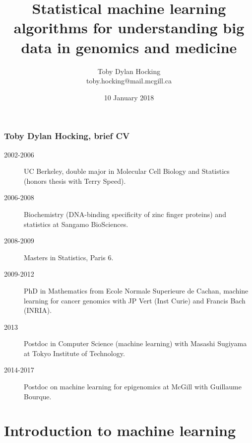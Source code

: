 \documentclass{beamer}
\begin{document}
\title{Statistical machine 
learning algorithms for 
understanding big data in
  genomics and medicine}
\date{10 January 2018}
\author{
  Toby Dylan Hocking\\
  toby.hocking@mail.mcgill.ca
}

\maketitle

\begin{frame}
  \frametitle{Toby Dylan Hocking, brief CV}
  \begin{description}
  \item[2002-2006] UC Berkeley, double major in Molecular Cell Biology
    and Statistics (honors thesis with Terry Speed).
  \item[2006-2008] Biochemistry (DNA-binding specificity of zinc
    finger proteins) and statistics at Sangamo BioSciences.
  \item[2008-2009] Masters in Statistics, Paris 6.
  \item[2009-2012] PhD in Mathematics from Ecole Normale Superieure de
    Cachan, machine learning for cancer genomics with JP Vert (Inst Curie)
    and Francis Bach (INRIA).
  \item[2013] Postdoc in Computer Science (machine learning) with Masashi Sugiyama at Tokyo
    Institute of Technology.
  \item[2014-2017] Postdoc on machine learning for epigenomics
    at McGill with Guillaume Bourque.
  \end{description}
\end{frame}

\section{Introduction to machine learning}
\end{document}
